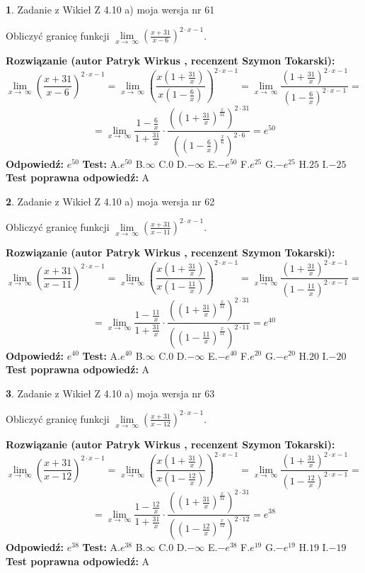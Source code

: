 \documentclass[12pt, a4paper]{article}
\theoremstyle{definition} %
\newtheorem{zad}{}
\newcommand{\zadStart}[1]{\begin{zad}#1\newline}
\newcommand{\zadStop}{\end{zad}}
\newcommand{\rozwStart}[2]{\noindent \textbf{Rozwiązanie (autor #1 , recenzent #2): }\newline}
\newcommand{\rozwStop}{\newline}
\newcommand{\odpStart}{\noindent \textbf{Odpowiedź:}\newline}
\newcommand{\odpStop}{\newline}
\newcommand{\testStart}{\noindent \textbf{Test:}\newline}
\newcommand{\testStop}{\newline}
\newcommand{\kluczStart}{\noindent \textbf{Test poprawna odpowiedź:}\newline}
\newcommand{\kluczStop}{\newline}
\begin{document}
\zadStart{Zadanie z Wikieł Z 4.10 a) moja wersja nr 61}

Obliczyć granicę funkcji  $\lim\limits_{x\to\ \infty}(\frac{x+31}{x-6})^{2\cdot x-1}$.
\zadStop
\rozwStart{Patryk Wirkus}{Szymon Tokarski}
$$\lim\limits_{x\to\ \infty}(\frac{x+31}{x-6})^{2\cdot x-1} = \lim\limits_{x\to\ \infty}(\frac{x(1+\frac{31}{x})}{x(1-\frac{6}{x})})^{2\cdot x-1}=\lim\limits_{x\to\ \infty}\frac{(1+\frac{31}{x})^{2\cdot x-1}}{(1-\frac{6}{x})^{2\cdot x-1}}=$$
$$=\lim\limits_{x\to\ \infty}\frac{1-\frac{6}{x}}{1+\frac{31}{x}}\cdot\frac{((1+\frac{31}{x})^{\frac{x}{31}})^{2\cdot31}}{((1-\frac{6}{x})^{\frac{x}{6}})^{2\cdot6}}=e^{50}$$
\rozwStop
\odpStart
$e^{50}$
\odpStop
\testStart
A.$e^{50}$ B.$\infty$ C.$0$ D.$-\infty$ E.$-e^{50}$
F.$e^{25}$ G.$-e^{25}$
H.$25$
I.$-25$
\testStop
\kluczStart
A
\kluczStop



\zadStart{Zadanie z Wikieł Z 4.10 a) moja wersja nr 62}

Obliczyć granicę funkcji  $\lim\limits_{x\to\ \infty}(\frac{x+31}{x-11})^{2\cdot x-1}$.
\zadStop
\rozwStart{Patryk Wirkus}{Szymon Tokarski}
$$\lim\limits_{x\to\ \infty}(\frac{x+31}{x-11})^{2\cdot x-1} = \lim\limits_{x\to\ \infty}(\frac{x(1+\frac{31}{x})}{x(1-\frac{11}{x})})^{2\cdot x-1}=\lim\limits_{x\to\ \infty}\frac{(1+\frac{31}{x})^{2\cdot x-1}}{(1-\frac{11}{x})^{2\cdot x-1}}=$$
$$=\lim\limits_{x\to\ \infty}\frac{1-\frac{11}{x}}{1+\frac{31}{x}}\cdot\frac{((1+\frac{31}{x})^{\frac{x}{31}})^{2\cdot31}}{((1-\frac{11}{x})^{\frac{x}{11}})^{2\cdot11}}=e^{40}$$
\rozwStop
\odpStart
$e^{40}$
\odpStop
\testStart
A.$e^{40}$ B.$\infty$ C.$0$ D.$-\infty$ E.$-e^{40}$
F.$e^{20}$ G.$-e^{20}$
H.$20$
I.$-20$
\testStop
\kluczStart
A
\kluczStop



\zadStart{Zadanie z Wikieł Z 4.10 a) moja wersja nr 63}

Obliczyć granicę funkcji  $\lim\limits_{x\to\ \infty}(\frac{x+31}{x-12})^{2\cdot x-1}$.
\zadStop
\rozwStart{Patryk Wirkus}{Szymon Tokarski}
$$\lim\limits_{x\to\ \infty}(\frac{x+31}{x-12})^{2\cdot x-1} = \lim\limits_{x\to\ \infty}(\frac{x(1+\frac{31}{x})}{x(1-\frac{12}{x})})^{2\cdot x-1}=\lim\limits_{x\to\ \infty}\frac{(1+\frac{31}{x})^{2\cdot x-1}}{(1-\frac{12}{x})^{2\cdot x-1}}=$$
$$=\lim\limits_{x\to\ \infty}\frac{1-\frac{12}{x}}{1+\frac{31}{x}}\cdot\frac{((1+\frac{31}{x})^{\frac{x}{31}})^{2\cdot31}}{((1-\frac{12}{x})^{\frac{x}{12}})^{2\cdot12}}=e^{38}$$
\rozwStop
\odpStart
$e^{38}$
\odpStop
\testStart
A.$e^{38}$ B.$\infty$ C.$0$ D.$-\infty$ E.$-e^{38}$
F.$e^{19}$ G.$-e^{19}$
H.$19$
I.$-19$
\testStop
\kluczStart
A
\kluczStop
\end{document}
